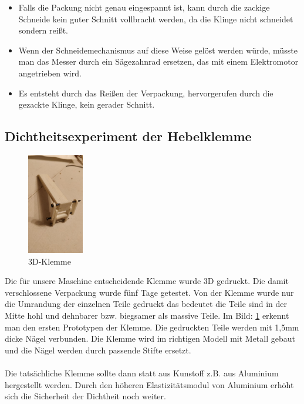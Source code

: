 \begin{itemize}
\item Falls die Packung nicht genau eingespannt ist, kann durch die zackige Schneide kein guter Schnitt vollbracht werden, da die Klinge nicht schneidet sondern reißt.
\item Wenn der Schneidemechanismus auf diese Weise gelöst werden würde, müsste man das Messer durch ein Sägezahnrad ersetzen, das mit einem Elektromotor angetrieben wird.
\item Es entsteht durch das Reißen der Verpackung, hervorgerufen durch die gezackte Klinge, kein gerader Schnitt.
\end{itemize}


\subsection{Dichtheitsexperiment der Hebelklemme}

\begin{figure}
\vspace{-10pt}
  \begin{center}
    \includegraphics[width=0.22\textwidth]{Bilder/Dichtheitsexperiment/Klemme}
  \end{center}
  \caption{3D-Klemme}
  \label{3D-Klemme}
  \vspace{-20pt}
\end{figure}

Die für unsere Maschine entscheidende Klemme wurde 3D gedruckt. Die damit verschlossene Verpackung wurde fünf Tage getestet. Von der Klemme wurde nur die Umrandung der einzelnen Teile gedruckt das bedeutet die Teile sind in der Mitte hohl und dehnbarer bzw. biegsamer als massive Teile. Im Bild: \ref{3D-Klemme} erkennt man den ersten Prototypen der Klemme. Die gedruckten Teile werden mit 1,5mm dicke Nägel verbunden. Die Klemme wird im richtigen Modell mit Metall gebaut und die Nägel werden durch passende Stifte ersetzt.\\\\ 
Die tatsächliche Klemme sollte dann statt aus Kunstoff z.B. aus Aluminium hergestellt werden. Durch den höheren Elastizitätsmodul von Aluminium erhöht sich die Sicherheit der Dichtheit noch weiter.


